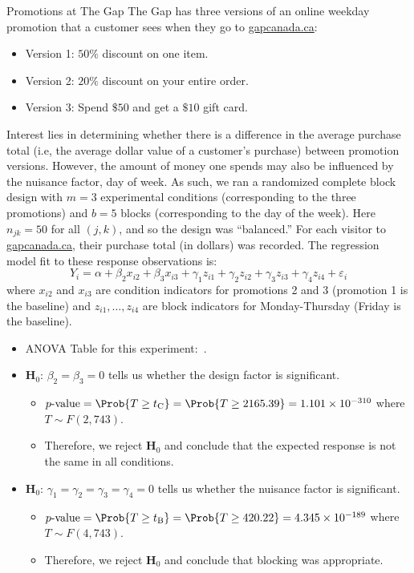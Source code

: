 \begin{Example}{Promotions at The Gap}{}
      The Gap has three versions of an online weekday promotion that a customer sees when they go to \href{https://www.gapcanada.ca/}{gapcanada.ca}:
      \begin{itemize}
            \item Version 1: $ 50\% $ discount on one item.
            \item Version 2: $ 20\% $ discount on your entire order.
            \item Version 3: Spend $ \$ 50 $ and get a $ \$ 10 $ gift card.
      \end{itemize}
      Interest lies in determining whether there is a difference in the average purchase total (i.e, the average
      dollar value of a customer's purchase) between promotion versions. However, the amount of money one
      spends may also be influenced by the nuisance factor, day of week. As such, we ran a randomized complete block
      design with $m = 3$ experimental conditions (corresponding to the three promotions) and $b = 5$
      blocks (corresponding to the day of the week). Here $n_{jk}=50$ for all $(j, k)$, and so the design was ``balanced.'' For
      each visitor to \href{https://www.gapcanada.ca/}{gapcanada.ca}, their purchase total (in dollars) was recorded.
      The regression model fit to these response observations is:
      \[ Y_i=\alpha+\beta_2 x_{i2}+\beta_3 x_{i3}+\gamma_1 z_{i1}+\gamma_2 z_{i2}+\gamma_3 z_{i3}+\gamma_4 z_{i4}+\varepsilon_i \]
      where $x_{i2}$ and $x_{i3}$ are condition indicators for promotions 2 and 3 (promotion 1 is the baseline) and $ z_{i1},\ldots,z_{i4} $
      are block indicators for Monday-Thursday (Friday is the baseline).
      \begin{itemize}
            \item ANOVA Table for this experiment:~.
            \item $ \mathbf{H}_0 $: $ \beta_2=\beta_3=0 $ tells us whether the design factor is significant.
                  \begin{itemize}
                        \item $ p\text{-value}=\Prob{T\ge t_\text{C}}=\Prob{T\ge 2165.39}=1.101\times 10^{-310} $ where $ T \sim F(2,743) $.
                        \item Therefore, we reject $ \mathbf{H}_0 $ and conclude that the expected response is not the same in all conditions.
                  \end{itemize}
            \item $ \mathbf{H}_0 $: $ \gamma_1=\gamma_2=\gamma_3=\gamma_4=0 $ tells us whether the nuisance factor is significant.
                  \begin{itemize}
                        \item $ p\text{-value}=\Prob{T\ge t_\text{B}}=\Prob{T\ge 420.22}=4.345\times 10^{-189} $ where $ T \sim F(4,743) $.
                        \item Therefore, we reject $ \mathbf{H}_0 $ and conclude that blocking was appropriate.
                  \end{itemize}
      \end{itemize}
\end{Example}
